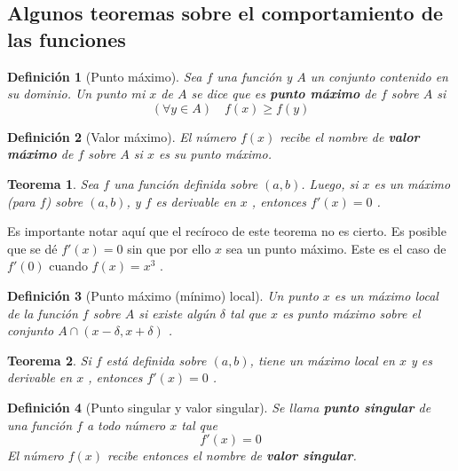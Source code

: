 \documentclass[12pt,a4paper]{extarticle}
\newtheorem{theorem}{Teorema}[section]
\newtheorem{mydef}{Definici\'on}[section]
\begin{document}

\subsection{Algunos teoremas sobre el comportamiento de las funciones}

\begin{mydef}[Punto m\'aximo]
Sea \( f \) una funci\'on y \( A \) un conjunto contenido en su
dominio. Un punto mi \( x \) de \( A \) se dice que es \textbf{punto
  m\'aximo} de \( f \) sobre \( A \)  si
\begin{equation}
(\forall y \in A) \quad f(x) \geq f(y)
\end{equation}
\end{mydef}

\begin{mydef}[Valor m\'aximo]
El n\'umero \( f(x) \) recibe el nombre de \textbf{valor m\'aximo} de
\( f \) sobre \( A \) si \( x \) es su punto m\'aximo.
\end{mydef}

\begin{theorem}
Sea \( f \) una funci\'on definida sobre \( (a,b) \). Luego, si \( x \)
es un m\'aximo (para \( f \)) sobre \( (a,b) \), y \( f \) es
derivable en \( x \) , entonces \( f'(x)=0 \) .
\end{theorem}
Es importante notar aqu\'i que el rec\'iroco de este teorema no es
cierto. Es posible que se d\'e \( f'(x)=0 \) sin que por ello \( x \)
sea un punto m\'aximo. Este es el caso de \( f'(0) \) cuando \(
f(x)=x^3 \) .

\begin{mydef}[Punto m\'aximo (m\'inimo) local]
Un punto \( x \) es un m\'aximo local de la funci\'on \( f \) sobre \(
A \) si existe alg\'un \( \delta \) tal que \( x \) es punto m\'aximo
sobre el conjunto \( A \cap (x-\delta, x+\delta) \) .
\end{mydef}

\begin{theorem}
Si \( f \) est\'a definida sobre \( (a,b) \), tiene un m\'aximo local
en \( x \) y es derivable en \( x \) , entonces \( f'(x)=0 \) .
\end{theorem}

\begin{mydef}[Punto singular y valor singular]
Se llama \textbf{punto singular} de una funci\'on \( f \)  a todo
n\'umero \( x \) tal que
\[ f'(x)=0 \]
El n\'umero \( f(x) \) recibe entonces el nombre de \textbf{valor singular}.
\end{mydef}
\end{document}
